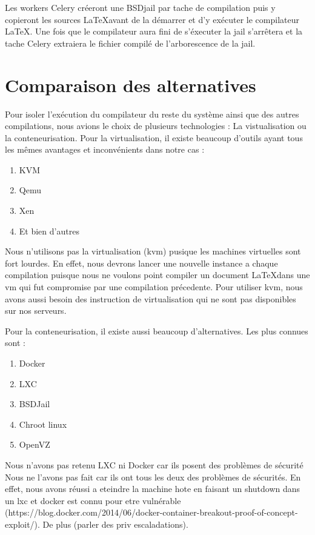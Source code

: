 \documentclass[10pt,a4paper]{article}
\begin{document}
Les workers Celery créeront une BSDjail par tache de compilation puis y copieront les sources \LaTeX avant de la démarrer et d'y exécuter le compilateur \LaTeX.
Une fois que le compilateur aura fini de s'éxecuter la jail s'arrêtera et la tache Celery extraiera le fichier compilé de l'arborescence de la jail.


\section{Comparaison des alternatives}
Pour isoler l'exécution du compilateur du reste du système ainsi que des autres compilations,
nous avions le choix de plusieurs technologies : La vistualisation ou la conteneurisation.
Pour la virtualisation, il existe beaucoup d'outils ayant tous les mêmes avantages et inconvénients dans notre cas :
\begin{enumerate}
    \item{KVM}
    \item{Qemu}
    \item{Xen}
    \item{Et bien d'autres}
\end{enumerate}

Nous n'utilisons pas la virtualisation (kvm) pusique les machines virtuelles sont fort lourdes.
En effet, nous devrons lancer une nouvelle instance a chaque compilation puisque nous ne voulons point compiler un document \LaTeX dans une vm qui fut compromise par une compilation précedente.
Pour utiliser kvm, nous avons aussi besoin des instruction de virtualisation qui ne sont pas disponibles sur nos serveurs.


Pour la conteneurisation, il existe aussi beaucoup d'alternatives. Les plus connues sont :
\begin{enumerate}
    \item{Docker}
    \item{LXC}
    \item{BSDJail}
    \item{Chroot linux}
    \item{OpenVZ}
\end{enumerate}

Nous n'avons pas retenu LXC ni Docker car ils posent des problèmes de sécurité
Nous ne l'avons pas fait car ils ont tous les deux des problèmes de sécurités.
En effet, nous avons réussi a eteindre la machine hote en faisant un shutdown dans un lxc et docker est connu pour etre vulnérable (https://blog.docker.com/2014/06/docker-container-breakout-proof-of-concept-exploit/).
De plus (parler des priv escaladations).
\end{document}
